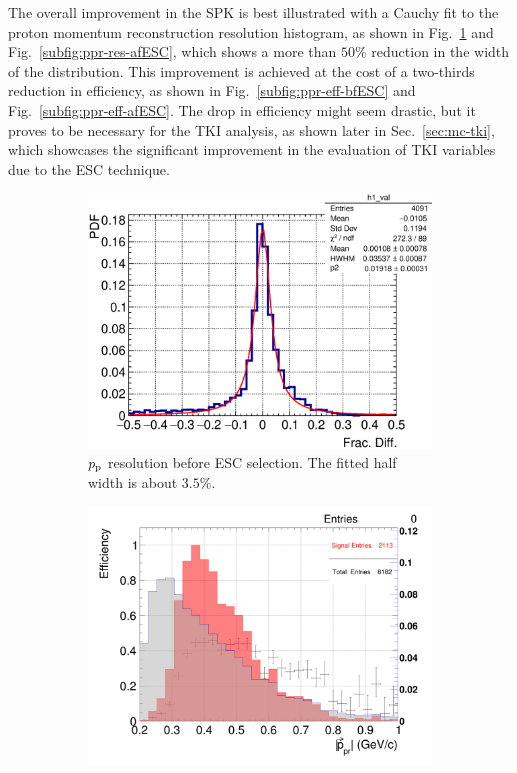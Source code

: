      The overall improvement in the SPK is best illustrated with a Cauchy fit to the proton momentum reconstruction resolution histogram, as shown in Fig.~\ref{subfig:ppr-res-bfESC} and Fig.~\ref{subfig:ppr-res-afESC}, which shows a more than $50\%$ reduction in the width of the distribution.
     This improvement is achieved at the cost of a two-thirds reduction in efficiency, as shown in Fig.~\ref{subfig:ppr-eff-bfESC} and Fig.~\ref{subfig:ppr-eff-afESC}.
     The drop in efficiency might seem drastic, but it proves to be necessary for the TKI analysis, as shown later in Sec.~\ref{sec:mc-tki}, which showcases the significant improvement in the evaluation of TKI variables due to the ESC technique.

   \begin{figure}[t]
      \centering
      \begin{subfigure}{\dbfigwid\textwidth}
           \includegraphics[width=\textwidth]{figures/sel/p_pr_res_pdf_al13_zoom.eps}
           \caption{$p_\textrm{p}$ resolution before ESC selection. The fitted half width is about $3.5\%$.}
           \label{subfig:ppr-res-bfESC}
      \end{subfigure}
      \begin{subfigure}{\dbfigwid\textwidth}
           \includegraphics[width=\textwidth]{figures/sel/p_pr_eff_al13.png}

\end{subfigure}
\end{figure}
